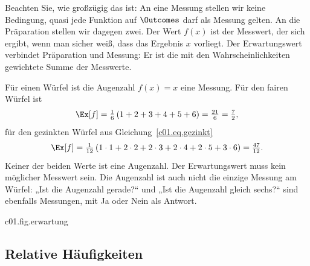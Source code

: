 
Beachten Sie, wie großzügig das ist: An eine Messung stellen wir keine Bedingung, quasi jede
Funktion auf $\Outcomes$ darf als Messung gelten. An die Präparation stellen wir dagegen
zwei. Der Wert $f(x)$ ist der Messwert, der sich ergibt, wenn man sicher weiß, dass das
Ergebnis $x$ vorliegt. Der Erwartungswert verbindet Präparation und Messung: Er ist die mit
den Wahrscheinlichkeiten gewichtete Summe der Messwerte.

\begin{example}[Augenzahl]\label{c01.ex.augenzahl}
  Für einen Würfel ist die Augenzahl $f(x) = x$ eine Messung. Für den fairen Würfel ist
  \begin{equation}\label{c01.eq.augenzahl-fair}
    \Ex[f] = \tfrac16\,(1 + 2 + 3 + 4 + 5 + 6) = \tfrac{21}{6} = \tfrac72 ,
  \end{equation}
  für den gezinkten Würfel aus Gleichung~\eqref{c01.eq.gezinkt}
  \begin{equation}\label{c01.eq.augenzahl-gezinkt}
    \Ex[f] = \tfrac{1}{12}\,(1\cdot 1 + 2\cdot 2 + 2\cdot 3 + 2\cdot 4 + 2\cdot 5 + 3\cdot 6)
           = \tfrac{47}{12} .
  \end{equation}
  Keiner der beiden Werte ist eine Augenzahl. Der Erwartungswert muss kein möglicher
  Messwert sein. Die Augenzahl ist auch nicht die einzige Messung am Würfel: „Ist die
  Augenzahl gerade?“ und „Ist die Augenzahl gleich sechs?“ sind ebenfalls Messungen, mit
  Ja oder Nein als Antwort.
\end{example}

\begin{tpcfigure}{c01.fig.erwartung}

  \caption{Der Erwartungswert der Augenzahl als Schwerpunkt. Denkt man sich die Gewichte
    $\pw(x)$ als Massen an den Stellen $x$ eines Balkens, so ist $\Ex[f]$ die Stelle, an
    der der Balken im Gleichgewicht ist: (a) beim fairen Würfel in der Mitte, bei
    $\tfrac72$; (b) beim gezinkten Würfel aus Gleichung~\eqref{c01.eq.gezinkt} nach rechts
    verschoben, bei $\tfrac{47}{12}$.}
\end{tpcfigure}

\subsection{Relative Häufigkeiten}\label{c01.s2.1}


